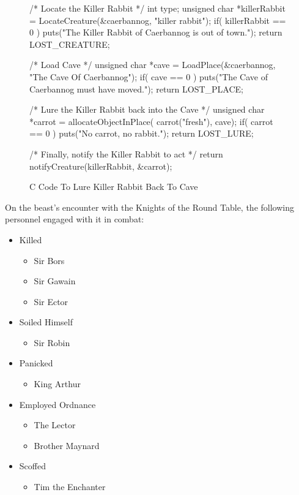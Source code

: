 \documentclass{metanorma}
\newenvironment{sourcecode}{\verbatim}{\endverbatim}
\begin{document}
\begin{figure}[h]\centering
\label{killer-source}
\caption{C Code To Lure Killer Rabbit Back To Cave}
\begin{sourcecode}
/* Locate the Killer Rabbit */
int type;
unsigned char *killerRabbit =
  LocateCreature(&caerbannog, "killer rabbit");
if( killerRabbit == 0 ){
  puts("The Killer Rabbit of Caerbannog is out of town.");
  return LOST_CREATURE;
}

/* Load Cave */
unsigned char *cave = LoadPlace(&caerbannog,
  "The Cave Of Caerbannog");
if( cave == 0 ){
  puts("The Cave of Caerbannog must have moved.");
  return LOST_PLACE;
}

/* Lure the Killer Rabbit back into the Cave */
unsigned char *carrot = allocateObjectInPlace(
  carrot("fresh"), cave);
if( carrot == 0 ){
  puts("No carrot, no rabbit.");
  return LOST_LURE;
}

/* Finally, notify the Killer Rabbit to act */
return notifyCreature(killerRabbit, &carrot);
\end{sourcecode}
\end{figure}



On the beast's encounter with the Knights of the Round Table,
the following personnel engaged with it in combat:


\begin{itemize}
  \item Killed
    \begin{itemize}
      \item Sir Bors
      \item Sir Gawain
      \item Sir Ector
    \end{itemize}
  \item Soiled Himself
    \begin{itemize}
      \item Sir Robin
    \end{itemize}
  \item Panicked
    \begin{itemize}
      \item King Arthur
    \end{itemize}
  \item Employed Ordnance
    \begin{itemize}
      \item The Lector
      \item Brother Maynard
    \end{itemize}
  \item Scoffed
    \begin{itemize}
      \item Tim the Enchanter
    \end{itemize}
\end{itemize}
\end{document}
